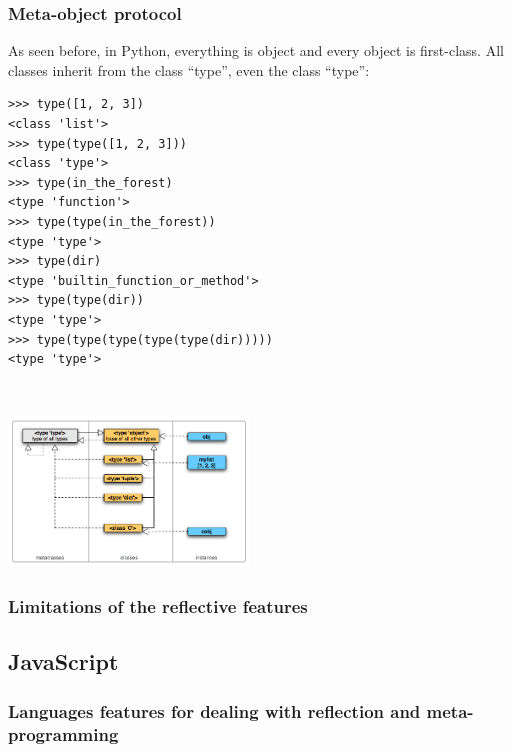\documentclass[a4paper,10pt]{article}
\begin{document}

\subsubsection{Meta-object protocol}

As seen before, in Python, everything is object and every object is first-class. All classes inherit from the class ``type'', even the class ``type'':

\begin{minipage}[c]{.48\linewidth}
\begin{lstlisting}
>>> type([1, 2, 3])
<class 'list'>
>>> type(type([1, 2, 3]))
<class 'type'>
>>> type(in_the_forest)
<type 'function'>
>>> type(type(in_the_forest))
<type 'type'>
>>> type(dir)
<type 'builtin_function_or_method'>
>>> type(type(dir))
<type 'type'>
>>> type(type(type(type(type(dir)))))
<type 'type'>
\end{lstlisting}
~\\
\end{minipage} \hfill
\begin{minipage}[c]{.48\linewidth}
\includegraphics[height=4cm]{typesmap.png}
\end{minipage}




\subsubsection{Limitations of the reflective features}




\newpage
\subsection{JavaScript}

\setjs
\subsubsection{Languages features for dealing with reflection and meta-programming}
\end{document}
